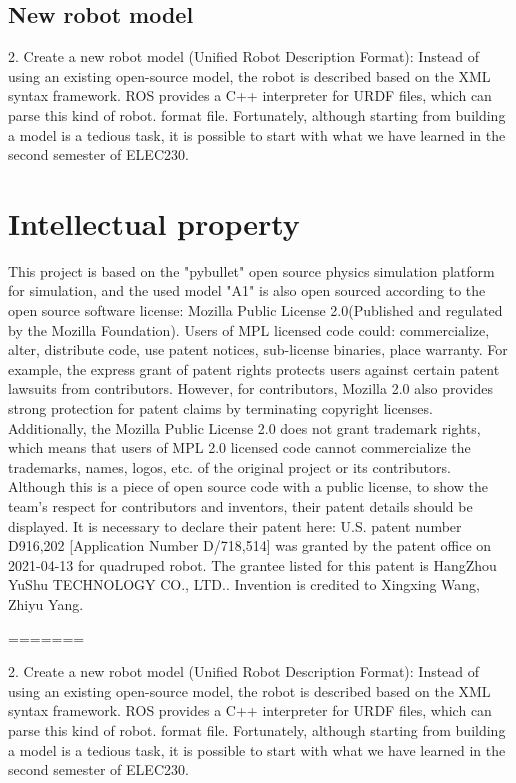 \subsection{New robot model}
2. Create a new robot model (Unified Robot Description Format): Instead of using an existing open-source model, the robot is described based on the XML syntax framework. ROS provides a C++ interpreter for URDF files, which can parse this kind of robot. format file. Fortunately, although starting from building a model is a tedious task, it is possible to start with what we have learned in the second semester of ELEC230. 

\section{Intellectual property}
This project is based on the "pybullet" open source physics simulation platform for simulation, and the used model "A1" is also open sourced according to the open source software license: Mozilla Public License 2.0(Published and regulated by the Mozilla Foundation). Users of MPL licensed code could: commercialize, alter, distribute code, use patent notices, sub-license binaries, place warranty. For example, the express grant of patent rights protects users against certain patent lawsuits from contributors. However, for contributors, Mozilla 2.0 also provides strong protection for patent claims by terminating copyright licenses. Additionally, the Mozilla Public License 2.0 does not grant trademark rights, which means that users of MPL 2.0 licensed code cannot commercialize the trademarks, names, logos, etc. of the original project or its contributors. Although this is a piece of open source code with a public license, to show the team's respect for contributors and inventors, their patent details should be displayed. It is necessary to declare their patent here: U.S. patent number D916,202 [Application Number D/718,514] was granted by the patent office on 2021-04-13 for quadruped robot. The grantee listed for this patent is HangZhou YuShu TECHNOLOGY CO., LTD.. Invention is credited to Xingxing Wang, Zhiyu Yang. 

=======

2. Create a new robot model (Unified Robot Description Format): Instead of using an existing open-source model, the robot is described based on the XML syntax framework. ROS provides a C++ interpreter for URDF files, which can parse this kind of robot. format file. Fortunately, although starting from building a model is a tedious task, it is possible to start with what we have learned in the second semester of ELEC230.

